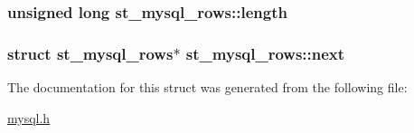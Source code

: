 \subsubsection[{length}]{\setlength{\rightskip}{0pt plus 5cm}unsigned long st\+\_\+mysql\+\_\+rows\+::length}\label{structst__mysql__rows_ae0da25ba59a9ef9c4e148664b3db13af}
\hypertarget{structst__mysql__rows_a83f438b68306724f8fd2f35758bbb2f7}{}
\subsubsection[{next}]{\setlength{\rightskip}{0pt plus 5cm}struct {\bf st\+\_\+mysql\+\_\+rows}$\ast$ st\+\_\+mysql\+\_\+rows\+::next}\label{structst__mysql__rows_a83f438b68306724f8fd2f35758bbb2f7}


The documentation for this struct was generated from the following file\+:\begin{DoxyCompactItemize}
\item 
\hyperlink{mysql_8h}{mysql.\+h}\end{DoxyCompactItemize}
